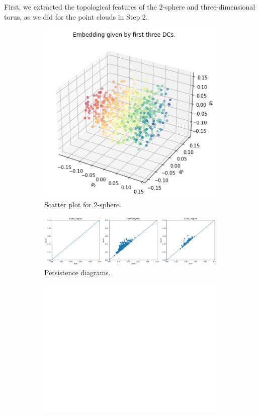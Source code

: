 First, we extracted the topological features of the $2$-sphere and three-dimensional torus, as we did for the point clouds in Step 2. 
\begin{figure}[H]
\centering
\begin{subfigure}[b]{0.2\textwidth}
    \includegraphics[width=\textwidth]{figures/topology/dsphere.png}
    \caption{Scatter plot for $2$-sphere.}
\end{subfigure}
\hfill
\begin{subfigure}[b]{0.75\textwidth}
    \includegraphics[width=\textwidth]{figures/topology/dsphere_Hk.png}
    \caption{Persistence diagrams.}
\end{subfigure}
\begin{subfigure}[b]{0.25\textwidth}
\includegraphics[width=\textwidth]{figures/topology/white.png} 

\end{subfigure}
\end{figure}
